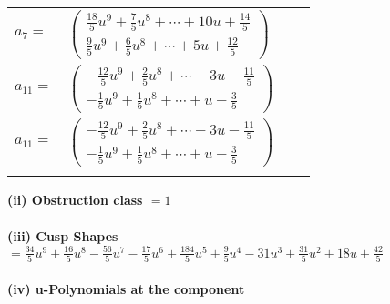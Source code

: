 \documentclass[1p]{elsarticle_modified}
\theoremstyle{definition}
\begin{document}
\begin{tabular}{m{7pt} m{180pt} m{7pt} m{180pt} }
\flushright $a_{7}=$&$\begin{pmatrix}\frac{18}{5} u^9+\frac{7}{5} u^8+\cdots+10 u+\frac{14}{5}\\\frac{9}{5} u^9+\frac{6}{5} u^8+\cdots+5 u+\frac{12}{5}\end{pmatrix}$ \\
\flushright $a_{11}=$&$\begin{pmatrix}-\frac{12}{5} u^9+\frac{2}{5} u^8+\cdots-3 u-\frac{11}{5}\\-\frac{1}{5} u^9+\frac{1}{5} u^8+\cdots+u-\frac{3}{5}\end{pmatrix}$\\ \flushright $a_{11}=$&$\begin{pmatrix}-\frac{12}{5} u^9+\frac{2}{5} u^8+\cdots-3 u-\frac{11}{5}\\-\frac{1}{5} u^9+\frac{1}{5} u^8+\cdots+u-\frac{3}{5}\end{pmatrix}$\\&\end{tabular}
\flushleft \textbf{(ii) Obstruction class $= 1$}\\~\\
\flushleft \textbf{(iii) Cusp Shapes $= \frac{34}{5} u^9+\frac{16}{5} u^8-\frac{56}{5} u^7-\frac{17}{5} u^6+\frac{184}{5} u^5+\frac{9}{5} u^4-31 u^3+\frac{31}{5} u^2+18 u+\frac{42}{5}$}\\~\\
\newpage\renewcommand{\arraystretch}{1}
\flushleft \textbf{(iv) u-Polynomials at the component}\newline \\
\end{document}
